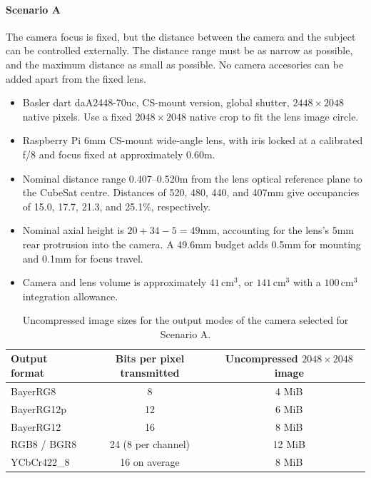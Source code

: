 \documentclass{article}
\begin{document}
\paragraph{Scenario A} The camera focus is fixed, but the distance between the camera and the subject can be controlled externally. The distance range must be as narrow as possible, and the maximum distance as small as possible. No camera accesories can be added apart from the fixed lens.
\begin{itemize}
\item Basler dart daA2448-70uc, CS-mount version, global shutter, $2448\times2048$ native pixels. Use a fixed $2048\times2048$ native crop to fit the lens image circle.
\item Raspberry Pi 6mm CS-mount wide-angle lens, with iris locked at a calibrated f/8 and focus fixed at approximately 0.60m.
\item Nominal distance range 0.407--0.520m from the lens optical reference plane to the CubeSat centre. Distances of 520, 480, 440, and 407mm give occupancies of 15.0, 17.7, 21.3, and 25.1\%, respectively.
\item Nominal axial height is $20+34-5=49$mm, accounting for the lens's 5mm rear protrusion into the camera. A 49.6mm budget adds 0.5mm for mounting and 0.1mm for focus travel.
\item Camera and lens volume is approximately $41\,\mathrm{cm}^3$, or $141\,\mathrm{cm}^3$ with a $100\,\mathrm{cm}^3$ integration allowance.
\end{itemize}

\begin{table}[htbp]
\centering
\caption{Uncompressed image sizes for the output modes of the camera selected for Scenario A.}
\begin{tabular}{lcc}
\hline
\textbf{Output format} & \textbf{Bits per pixel transmitted} & \textbf{Uncompressed $2048 \times 2048$ image} \\
\hline
BayerRG8 & 8 & 4 MiB \\
BayerRG12p & 12 & 6 MiB \\
BayerRG12 & 16 & 8 MiB \\
RGB8 / BGR8 & 24 (8 per channel) & 12 MiB \\
YCbCr422\_8 & 16 on average & 8 MiB \\
\hline
\end{tabular}
\end{table}
\end{document}
